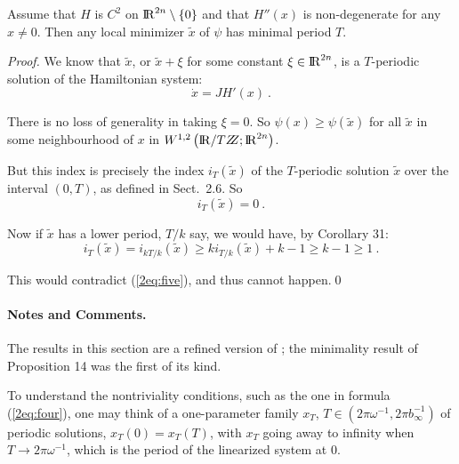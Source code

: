 \documentclass{llncs}
\begin{document}
\begin{lemma}
Assume that $H$ is $C^{2}$ on ${\rm I\!R}^{2n} \setminus \{ 0\}$ and
that $H'' (x)$ is non-de\-gen\-er\-ate for any $x\ne 0$. Then any local
minimizer $\widetilde{x}$ of $\psi$ has minimal period $T$.
\end{lemma}
%
\begin{proof}
We know that $\widetilde{x}$, or
$\widetilde{x} + \xi$ for some constant $\xi
\in {\rm I\!R}^{2n}$, is a $T$-periodic solution of the Hamiltonian system:
\begin{equation}
  \dot{x} = JH' (x)\ .
\end{equation}

There is no loss of generality in taking $\xi = 0$. So
$\psi (x) \ge \psi (\widetilde{x} )$
for all $\widetilde{x}$ in some neighbourhood of $x$ in
$W^{1,2} \left(\bbbr / T\bbbz ; \bbbr^{2n}\right)$.

But this index is precisely the index
$i_{T} (\widetilde{x} )$ of the $T$-periodic
solution $\widetilde{x}$ over the interval
$(0,T)$, as defined in Sect.~2.6. So
\begin{equation}
  i_{T} (\widetilde{x} ) = 0\ .
  \label{2eq:five}
\end{equation}

Now if $\widetilde{x}$ has a lower period, $T/k$ say,
we would have, by Corollary 31:
\begin{equation}
  i_{T} (\widetilde{x} ) =
  i_{kT/k}(\widetilde{x} ) \ge
  ki_{T/k} (\widetilde{x} ) + k-1 \ge k-1 \ge 1\ .
\end{equation}

This would contradict (\ref{2eq:five}), and thus cannot happen.\qed
\end{proof}
%
\paragraph{Notes and Comments.}
The results in this section are a
refined version of \cite{2clar:eke};
the minimality result of Proposition
14 was the first of its kind.

To understand the nontriviality conditions, such as the one in formula
(\ref{2eq:four}), one may think of a one-parameter family
$x_{T}$, $T\in \left(2\pi\omega^{-1}, 2\pi b_{\infty}^{-1}\right)$
of periodic solutions, $x_{T} (0) = x_{T} (T)$,
with $x_{T}$ going away to infinity when $T\to 2\pi \omega^{-1}$,
which is the period of the linearized system at 0.
\end{document}
